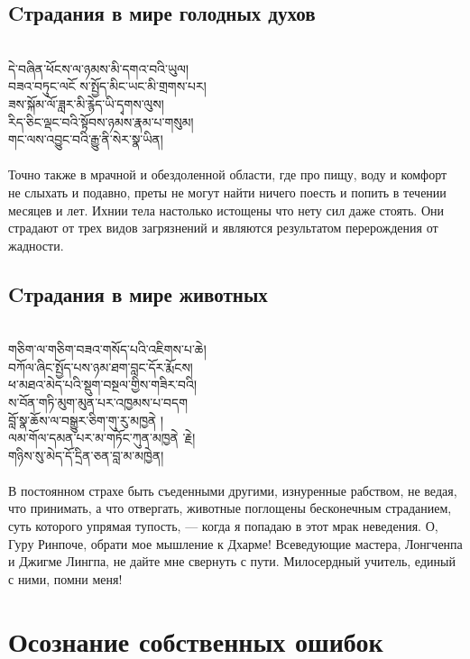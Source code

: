 \newpage
\subsection*{Cтрадания в мире голодных духов}
\\
\ti
དེ་བཞིན་ཕོངས་ལ་ཉམས་མི་དགའ་བའི་ཡུལ།\\
བཟའ་བཏུང་ལངོ ས་སྤྱོད་མིང་ཡང་མི་གྲགས་པར། \\
ཟས་སྐོམ་ལོ་ཟླར་མི་རྙེད་ཡི་དྭགས་ལུས། \\
རིད་ཅིང་ལྡང་བའི་སྟོབས་ཉམས་རྣམ་པ་གསུམ། \\
གང་ལས་འབྱུང་བའི་རྒྱུ་ནི་སེར་སྣ་ཡིན།\\
\\
\ru
Точно также в мрачной и обездоленной области,
где про пищу, воду и комфорт не слыхать и подавно,
преты не могут найти ничего поесть и попить в течении месяцев и лет.
Ихнии тела настолько истощены что нету сил даже стоять.
Они страдают от трех видов загрязнений и
являются результатом перерождения от жадности.

\subsection*{Cтрадания в мире животных}
\\
\ti
གཅིག་ལ་གཅིག་བཟའ་གསོད་པའི་འཇིགས་པ་ཆེ།\\
བཀོལ་ཞིང་སྤྱོད་པས་ཉམ་ཐག་བླང་དོར་རྨོངས། \\
ཕ་མཐའ་མེད་པའི་སྡུག་བསྔལ་གྱིས་གཟིར་བའི། \\
ས་བོན་གཏི་མུག་མུན་པར་འཁྱམས་པ་བདག \\
བློ་སྣ་ཆོས་ལ་བསྒྱུར་ཅིག་གུ་རུ་མཁྱནེ ། \\
ལམ་གོལ་དམན་པར་མ་གཏོང་ཀུན་མཁྱནེ ་རྗེ། \\
གཉིས་སུ་མེད་དོ་དྲིན་ཅན་བླ་མ་མཁྱེན།\\
\\
\ru
В постоянном страхе быть съеденными другими,
изнуренные рабством, не ведая, что принимать, а что отвергать,
животные поглощены бесконечным страданием,
суть которого упрямая тупость, — когда я попадаю в этот мрак неведения.
О, Гуру Ринпоче, обрати мое мышление к Дхарме!
Всеведующие мастера, Лонгченпа и Джигме Лингпа, не дайте мне свернуть с пути.
Милосердный учитель, единый с ними, помни меня!

\section*{Осознание собственных ошибок}
